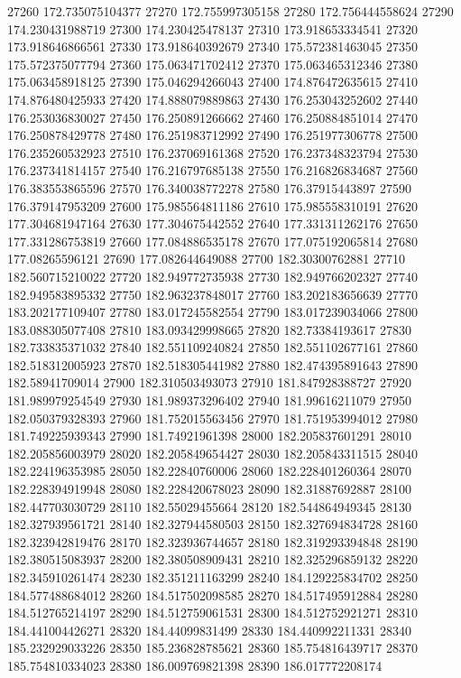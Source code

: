 {27260 172.735075104377
27270 172.755997305158
27280 172.756444558624
27290 174.230431988719
27300 174.230425478137
27310 173.918653334541
27320 173.918646866561
27330 173.918640392679
27340 175.572381463045
27350 175.572375077794
27360 175.063471702412
27370 175.063465312346
27380 175.063458918125
27390 175.046294266043
27400 174.876472635615
27410 174.876480425933
27420 174.888079889863
27430 176.253043252602
27440 176.253036830027
27450 176.250891266662
27460 176.250884851014
27470 176.250878429778
27480 176.251983712992
27490 176.251977306778
27500 176.235260532923
27510 176.237069161368
27520 176.237348323794
27530 176.237341814157
27540 176.216797685138
27550 176.216826834687
27560 176.383553865596
27570 176.340038772278
27580 176.37915443897
27590 176.379147953209
27600 175.985564811186
27610 175.985558310191
27620 177.304681947164
27630 177.304675442552
27640 177.331311262176
27650 177.331286753819
27660 177.084886535178
27670 177.075192065814
27680 177.08265596121
27690 177.082644649088
27700 182.30300762881
27710 182.560715210022
27720 182.949772735938
27730 182.949766202327
27740 182.949583895332
27750 182.963237848017
27760 183.202183656639
27770 183.202177109407
27780 183.017245582554
27790 183.017239034066
27800 183.088305077408
27810 183.093429998665
27820 182.73384193617
27830 182.733835371032
27840 182.551109240824
27850 182.551102677161
27860 182.518312005923
27870 182.518305441982
27880 182.474395891643
27890 182.58941709014
27900 182.310503493073
27910 181.847928388727
27920 181.989979254549
27930 181.989373296402
27940 181.99616211079
27950 182.050379328393
27960 181.752015563456
27970 181.751953994012
27980 181.749225939343
27990 181.74921961398
28000 182.205837601291
28010 182.205856003979
28020 182.205849654427
28030 182.205843311515
28040 182.224196353985
28050 182.22840760006
28060 182.228401260364
28070 182.228394919948
28080 182.228420678023
28090 182.31887692887
28100 182.447703030729
28110 182.55029455664
28120 182.544864949345
28130 182.327939561721
28140 182.327944580503
28150 182.327694834728
28160 182.323942819476
28170 182.323936744657
28180 182.319293394848
28190 182.380515083937
28200 182.380508909431
28210 182.325296859132
28220 182.345910261474
28230 182.351211163299
28240 184.129225834702
28250 184.577488684012
28260 184.517502098585
28270 184.517495912884
28280 184.512765214197
28290 184.512759061531
28300 184.512752921271
28310 184.441004426271
28320 184.44099831499
28330 184.440992211331
28340 185.232929033226
28350 185.236828785621
28360 185.754816439717
28370 185.754810334023
28380 186.009769821398
28390 186.017772208174
}
